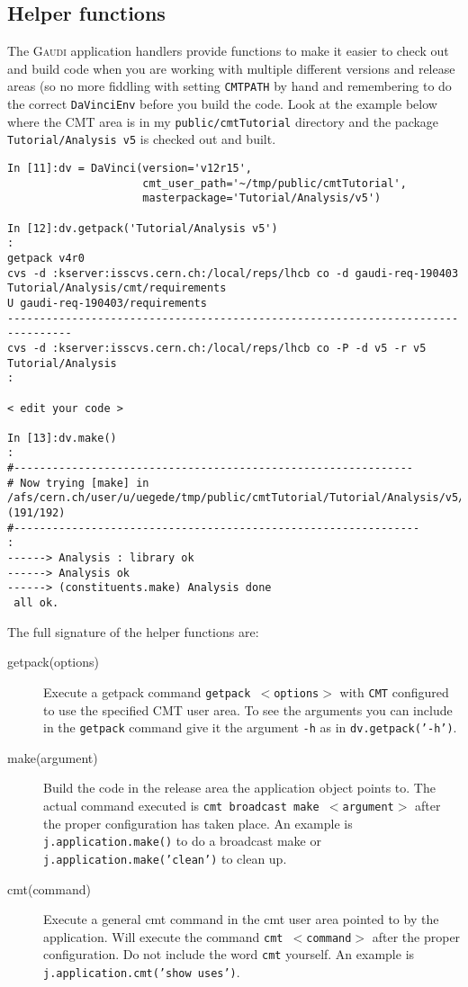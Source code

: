 \documentclass{howto}
\def\gaudi {\textsc{Gaudi}\xspace}
\begin{document}
\subsection{Helper functions}
\label{sec:gaudiHelpers}
The \gaudi application handlers provide functions to make it easier to check
out and build code when you are working with multiple different versions and
release areas (so no more fiddling with setting \texttt{CMTPATH} by hand and
remembering to do the correct \texttt{DaVinciEnv} before you build the code.
Look at the example below where the CMT area is in my
\texttt{public/cmtTutorial} directory and the package
\texttt{Tutorial/Analysis v5} is checked out and built.
\begin{verbatim}
In [11]:dv = DaVinci(version='v12r15', 
                     cmt_user_path='~/tmp/public/cmtTutorial',
                     masterpackage='Tutorial/Analysis/v5')
 
In [12]:dv.getpack('Tutorial/Analysis v5')
:
getpack v4r0
cvs -d :kserver:isscvs.cern.ch:/local/reps/lhcb co -d gaudi-req-190403 Tutorial/Analysis/cmt/requirements
U gaudi-req-190403/requirements
--------------------------------------------------------------------------------
cvs -d :kserver:isscvs.cern.ch:/local/reps/lhcb co -P -d v5 -r v5 Tutorial/Analysis
:

< edit your code >

In [13]:dv.make()
:
#--------------------------------------------------------------
# Now trying [make] in /afs/cern.ch/user/u/uegede/tmp/public/cmtTutorial/Tutorial/Analysis/v5/cmt (191/192)
#---------------------------------------------------------------
:
------> Analysis : library ok
------> Analysis ok
------> (constituents.make) Analysis done
 all ok.
\end{verbatim}
The full signature of the helper functions are:
\begin{description}
\item[getpack(options)] Execute a getpack command \texttt{getpack
    $<$options$>$} with \texttt{CMT} configured to use the specified CMT user
  area. To see the arguments you can include in the \texttt{getpack}
    command give it the argument \texttt{-h} as in \texttt{dv.getpack('-h')}.
\item[make(argument)] Build the code in the release area the application
  object points to. The actual command executed is \texttt{cmt broadcast make
    $<$argument$>$} after the proper configuration has taken place. An example
  is \texttt{j.application.make()} to do a broadcast make or
  \texttt{j.application.make('clean')} to clean up.
\item[cmt(command)] Execute a general cmt command in the cmt user area pointed
  to by the application. Will execute the command \texttt{cmt $<$command$>$}
  after the proper configuration. Do not include the word \texttt{cmt}
  yourself. An example is \texttt{j.application.cmt('show uses')}.
\end{description}
\end{document}
